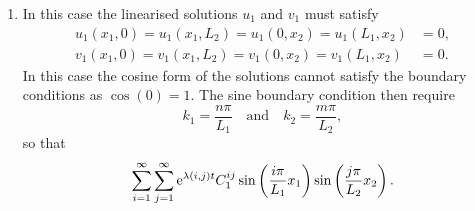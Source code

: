 \documentclass[a4paper, 12pt]{article}
\begin{document}
\begin{enumerate}[label={\bf \arabic{*}.\;}, ref={\arabic{*}},itemsep=3ex, left=0ex]
{\begin{enumerate}[label=(\alph*)]
{            Finally, in order to solve \cref{lineq} for nontrivial solutions $u_1$ and $v_1$ we require $\det(\m{J}-\lambda \m{I}=0$ where $\m{I}$ is the identity matrix. Solutions to this take the form
              \begin{equation}
                \lambda(i,j) = \frac{1}{2}\left[\tr\m{J} \pm \sqrt{\left(\tr\m{J}\right)^2 - 4\det\m{J}}\right]
              \end{equation}
              with
              \begin{align}
                \tr\m{J} &= \gamma(F_u + G_v)  - k_s(i,j)(D+1),\\
                \det\m{J} & =D k_s(i,j)^2 - \gamma k_s(i,j) \left(D F_u + G_v\right)  + \gamma^2(F_uG_v- F_vG_u),
              \end{align}
              and
              \begin{align}
                k_s(i,j) = \pi^2\left( \frac{i^2}{L_1^2}+ \frac{j^2}{L_2^2}\right),\\
                k_s(i,j) = \pi^2\left( \frac{i^2}{L_1^2}+ \frac{4 j^2}{L_2^2}\right),\\
                k_s(i,j) = \pi^2\left( \frac{4i^2}{L_1^2}+ \frac{j^2}{L_2^2}\right),\\
                k_s(i,j) = \pi^2\left( \frac{4i^2}{L_1^2}+ \frac{4 j^2}{L_2^2}\right),
              \end{align}
              depending on the particular solution type.
            }
          \item{
              In this case the linearised solutions $u_1$ and $v_1$ must satisfy
              \begin{align}
                u_1(x_1,0) = u_1(x_1,L_2)  = u_1(0,x_2) = u_1(L_1,x_2) &= 0,\\   v_1(x_1,0) = v_1(x_1,L_2)  =v_1(0,x_2) = v_1(L_1,x_2) &= 0.
              \end{align}
              In this case the cosine form of the solutions cannot satisfy the boundary conditions as $\cos(0)=1$. The sine boundary condition then require
              \begin{equation}
                k_1 = \frac{n\pi}{L_1} \quad \text{and} \quad k_2 = \frac{m\pi}{L_2},
              \end{equation}
              so that
              \begin{align}
                \sum_{i=1}^{\infty}\sum_{j=1}^{\infty}\mathrm{e}^{\lambda(i,j)t}C_1^{ij}\sin\left(\frac{i\pi}{L_1}x_1\right)\sin\left(\frac{j\pi}{L_2}x_2\right).
              \end{align}
}
\end{enumerate}}
\end{enumerate}
\end{document}
